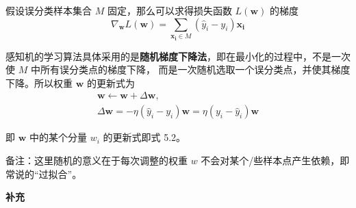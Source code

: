 \documentclass[../studies-ml.tex]{subfiles}
\begin{document}
\begin{enumerate}[I]
        假设误分类样本集合 $M$ 固定，那么可以求得损失函数 $L(\pmb{w})$ 的梯度
        \[ \nabla_{\pmb{w}} L(\pmb{w}) = \sum_{\pmb{x_i} \in M} (\hat{y}_i - y_i) \pmb{x_i} \]

        感知机的学习算法具体采用的是\textbf{随机梯度下降法}，即在最小化的过程中，不是一次使 $M$ 中所有误分类点的梯度下降，
        而是一次随机选取一个误分类点，并使其梯度下降。所以权重 $\pmb{w}$ 的更新式为
        \begin{gather*}
          \pmb{w} \leftarrow \pmb{w} + \Delta \pmb{w}, \\
          \Delta \pmb{w} = -\eta (\hat{y}_i - y_i) \pmb{w} = \eta (y_i - \hat{y}_i) \pmb{w}
        \end{gather*}

        即 $\pmb{w}$ 中的某个分量 $w_i$ 的更新式即式 5.2。

        备注：这里随机的意义在于每次调整的权重 $w$ 不会对某个/些样本点产生依赖，即常说的“过拟合”。
\end{enumerate}

\bigbreak
\textbf{补充}
\end{document}
